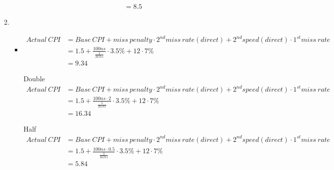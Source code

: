 \documentclass{article}
\begin{document}
\begin{enumerate}[1)]
\begin{enumerate}
\begin{itemize}
\begin{equation}
\begin{split}
                                &= 8.5
                            \end{split}
                        \end{equation}
                \end{itemize}
            \item 
                \begin{itemize}
                    \item 
                        \begin{equation}
                            \begin{split}
                                Actual\:CPI &= Base\:CPI + miss\:penalty \cdot 2^{nd} miss\:rate(direct) + 2^{nd} speed(direct) \cdot 1^{st}miss\:rate \\
                                &= 1.5 + \frac{100ns}{\frac{1}{2Ghz}} \cdot 3.5\% + 12 \cdot 7\% \\
                                &= 9.34
                            \end{split}
                        \end{equation}
                    \item [Double]
                        \begin{equation}
                            \begin{split}
                                Actual\:CPI &= Base\:CPI + miss\:penalty \cdot 2^{nd} miss\:rate(direct) + 2^{nd} speed(direct) \cdot 1^{st}miss\:rate \\
                                &= 1.5 + \frac{100ns \cdot 2}{\frac{1}{2Ghz}} \cdot 3.5\% + 12 \cdot 7\% \\
                                &= 16.34
                            \end{split}
                        \end{equation}
                    \item [Half]
                        \begin{equation}
                            \begin{split}
                                Actual\:CPI &= Base\:CPI + miss\:penalty \cdot 2^{nd} miss\:rate(direct) + 2^{nd} speed(direct) \cdot 1^{st}miss\:rate \\
                                &= 1.5 + \frac{100ns \cdot 0.5}{\frac{1}{2Ghz}} \cdot 3.5\% + 12 \cdot 7\% \\
                                &= 5.84
                            \end{split}

\end{equation}
\end{itemize}
\end{enumerate}
\end{enumerate}
\end{document}
